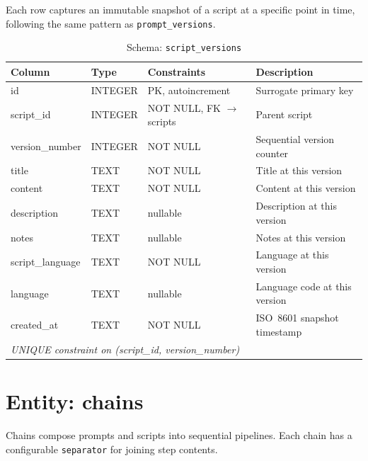 \documentclass[a4paper, 11pt, oneside]{report}
\begin{document}
Each row captures an immutable snapshot of a script at a specific point in
time, following the same pattern as \texttt{prompt\_versions}.

\begin{table}[H]
  \centering
  \caption{Schema: \texttt{script\_versions}}
  \label{tab:schema-script-versions}
  \begin{tabularx}{\textwidth}{l l l X}
    \toprule
    \textbf{Column} & \textbf{Type} & \textbf{Constraints} & \textbf{Description} \\
    \midrule
    id              & INTEGER & PK, autoincrement          & Surrogate primary key \\
    script\_id      & INTEGER & NOT NULL, FK $\to$ scripts & Parent script \\
    version\_number & INTEGER & NOT NULL                   & Sequential version counter \\
    title           & TEXT    & NOT NULL                   & Title at this version \\
    content         & TEXT    & NOT NULL                   & Content at this version \\
    description     & TEXT    & nullable                   & Description at this version \\
    notes           & TEXT    & nullable                   & Notes at this version \\
    script\_language& TEXT    & NOT NULL                   & Language at this version \\
    language        & TEXT    & nullable                   & Language code at this version \\
    created\_at     & TEXT    & NOT NULL                   & ISO~8601 snapshot timestamp \\
    \multicolumn{4}{l}{\textit{UNIQUE constraint on (script\_id, version\_number)}} \\
    \bottomrule
  \end{tabularx}
\end{table}

\section{Entity: chains}
\label{sec:entity-chains}

Chains compose prompts and scripts into sequential pipelines.  Each chain
has a configurable \texttt{separator} for joining step contents.
\end{document}
